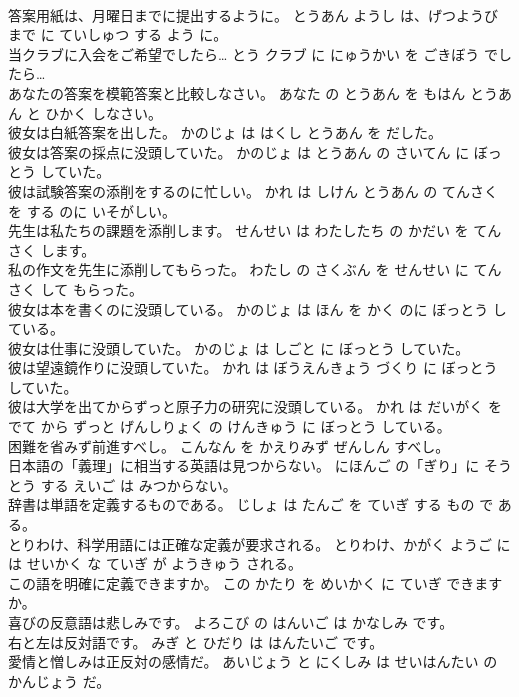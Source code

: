 \documentclass[8pt]{extreport}
\begin{document}
\begin{CJK}{UTF8}{min}
\\	答案用紙は、月曜日までに提出するように。	とうあん ようし は、げつようび まで に ていしゅつ する よう に。	
\\	当クラブに入会をご希望でしたら…	とう クラブ に にゅうかい を ごきぼう でしたら…	
\\	あなたの答案を模範答案と比較しなさい。	あなた の とうあん を もはん とうあん と ひかく しなさい。	
\\	彼女は白紙答案を出した。	かのじょ は はくし とうあん を だした。	
\\	彼女は答案の採点に没頭していた。	かのじょ は とうあん の さいてん に ぼっとう していた。	
\\	彼は試験答案の添削をするのに忙しい。	かれ は しけん とうあん の てんさく を する のに いそがしい。	
\\	先生は私たちの課題を添削します。	せんせい は わたしたち の かだい を てんさく します。	
\\	私の作文を先生に添削してもらった。	わたし の さくぶん を せんせい に てんさく して もらった。	
\\	彼女は本を書くのに没頭している。	かのじょ は ほん を かく のに ぼっとう している。	
\\	彼女は仕事に没頭していた。	かのじょ は しごと に ぼっとう していた。	
\\	彼は望遠鏡作りに没頭していた。	かれ は ぼうえんきょう づくり に ぼっとう していた。	
\\	彼は大学を出てからずっと原子力の研究に没頭している。	かれ は だいがく を でて から ずっと げんしりょく の けんきゅう に ぼっとう している。	
\\	困難を省みず前進すべし。	こんなん を かえりみず ぜんしん すべし。	
\\	日本語の「義理」に相当する英語は見つからない。	にほんご の「ぎり」に そうとう する えいご は みつからない。	
\\	辞書は単語を定義するものである。	じしょ は たんご を ていぎ する もの で ある。	
\\	とりわけ、科学用語には正確な定義が要求される。	とりわけ、かがく ようご には せいかく な ていぎ が ようきゅう される。	
\\	この語を明確に定義できますか。	この かたり を めいかく に ていぎ できます か。	
\\	喜びの反意語は悲しみです。	よろこび の はんいご は かなしみ です。	
\\	右と左は反対語です。	みぎ と ひだり は はんたいご です。	
\\	愛情と憎しみは正反対の感情だ。	あいじょう と にくしみ は せいはんたい の かんじょう だ。	

\end{CJK}
\end{document}
